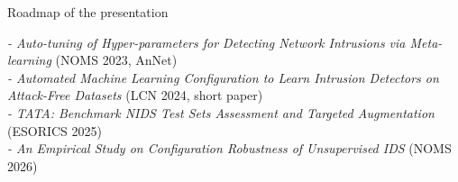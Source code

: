 \begin{frame}{Roadmap of the presentation}
	\vspace{-0.30em}
	{\fontsize{8}{5.2}\selectfont
		\parbox{0.99\linewidth}{\centering
			\emph{- Auto-tuning of Hyper-parameters for Detecting Network Intrusions via Meta-learning} (NOMS 2023, AnNet)\\
			\emph{- Automated Machine Learning Configuration to Learn Intrusion Detectors on Attack-Free Datasets} (LCN 2024, short paper)\\
			\emph{- TATA: Benchmark NIDS Test Sets Assessment and Targeted Augmentation} (ESORICS 2025)\\
			\emph{- An Empirical Study on Configuration Robustness of Unsupervised IDS} (NOMS 2026)}}

\end{frame}

